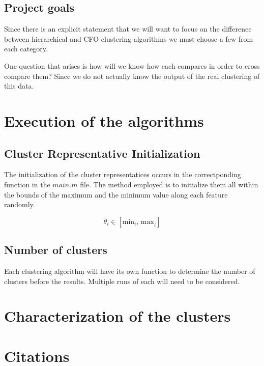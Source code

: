 \documentclass[12pt, a4paper]{article}
\begin{document}
\subsection{Project goals}

Since there is an explicit statement that we will want to focus on the difference between hierarchical and CFO clustering algorithms we must choose a few from each category.
\newline

One question that arises is how will we know how each compares in order to cross compare them? Since we do not actually know the output of the real clustering of this data.

\section{Execution of the algorithms}

\subsection{Cluster Representative Initialization}

The initialization of the cluster representatices occurs in the correctponding function in the $main.m$ file. The method employed is to initialize them all within the bounds of the maximum and the minimum value along each feature randomly.

\[\theta_i \in \left[\text{min}_i \text{, max}_i\right]\]

\subsection{Number of clusters}

Each clustering algorithm will have its own function to determine the number of clusters before the results. Multiple runs of each will need to be considered.

\section{Characterization of the clusters}

\section{Citations}
\end{document}
